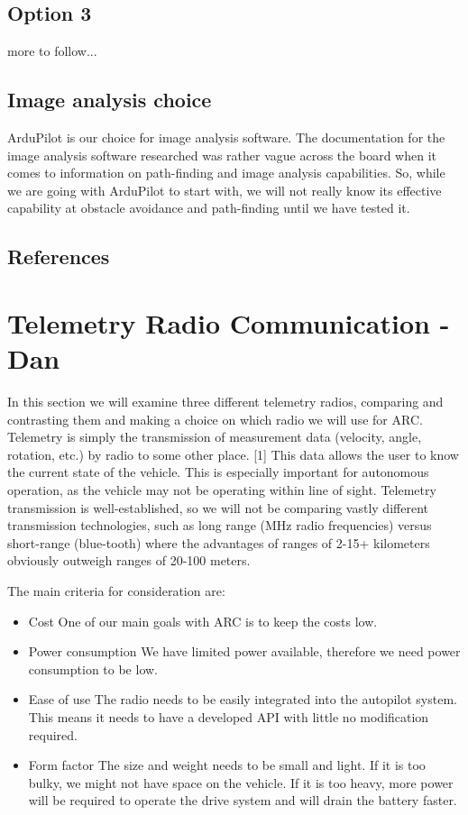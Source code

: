 \documentclass[compsoc,draftclsnofoot,onecolumn,10pt]{IEEEtran}
\begin{document}
\subsection{Option 3}
more to follow...

\subsection{Image analysis choice}
ArduPilot is our choice for image analysis software. The documentation for the
image analysis software researched was rather vague across the board when it
comes to information on path-finding and image analysis capabilities. So, while
we are going with ArduPilot to start with, we will not really know its effective
capability at obstacle avoidance and path-finding until we have tested it.

\subsection{References}

\newpage

\section{Telemetry Radio Communication - Dan}
In this section we will examine three different telemetry radios, comparing and
contrasting them and making a choice on which radio we will use for ARC.
Telemetry is simply the transmission of measurement data (velocity, angle,
rotation, etc.) by radio to some other place. [1] This data allows the user to know the current state of the vehicle. This is especially
important for autonomous operation, as the vehicle may not be operating within
line of sight. Telemetry transmission is
well-established, so we will not be comparing vastly different transmission
technologies, such as long range (MHz radio frequencies) versus short-range
(blue-tooth) where the advantages of ranges of 2-15+ kilometers obviously
outweigh ranges of 20-100 meters.

The main criteria for consideration are:
\begin{itemize}

	\item Cost
		\subitem One of our main goals with ARC is to keep the costs low.
	\item Power consumption
		\subitem We have limited power available, therefore we need power
		consumption to be low.

	\item Ease of use
		\subitem The radio needs to be easily integrated into the autopilot
		system. This means it needs to have a developed API with little no
		modification required.

	\item Form factor
		\subitem The size and weight needs to be small and light. If it is too
		bulky, we might not have space on the vehicle. If it is too heavy, more
		power will be required to operate the drive system and will drain the
		battery faster.

\end{itemize}
\end{document}
